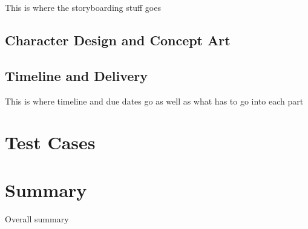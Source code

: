 \documentclass[12pt]{IEEEtran}
\begin{document}
This is where the storyboarding stuff goes

\subsection{Character Design and Concept Art}
\label{subsec:cdesign}

\subsection{Timeline and Delivery}
\label{subsec:timeline}

This is where timeline and due dates go as well as what has to go into each part

\section{Test Cases}
\label{sec:test}

\section{Summary}
\label{sec:summary}

Overall summary
\end{document}
